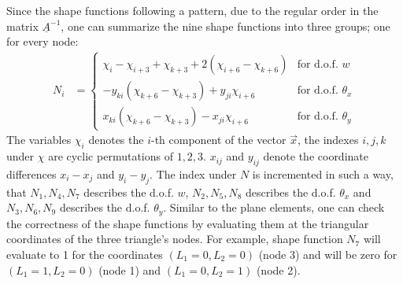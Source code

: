   Since the shape functions following a pattern, due to the regular order in the matrix $\underline{A}^{-1}$, one can summarize the nine shape functions into three groups; one for every node:
  \begin{align}
  N_i &= \begin{cases}
  \chi_i - \chi_{i+3} + \chi_{k+3} + 2\left(\chi_{i+6} - \chi_{k+6}\right) & \text{for d.o.f. } w\\
  -y_{ki}\left(\chi_{k+6} - \chi_{k+3}\right) + y_{ji} \chi_{i+6} & \text{for d.o.f. } \theta_x\\
  x_{ki}\left(\chi_{k+6} - \chi_{k+3}\right) - x_{ji} \chi_{i+6} & \text{for d.o.f. } \theta_y
  \end{cases}
  \end{align}
  The variables $\chi_i$ denotes the $i$-th component of the vector $\vec{x}$, the indexes $i,j,k$ under $\chi$ are cyclic permutations of $1,2,3$. $x_{ij}$ and $y_{ij}$ denote the coordinate differences $x_i - x_j$ and $y_i - y_j$. The index under $N$ is incremented in such a way, that $N_1, N_4, N_7$ describes the d.o.f. $w$, $N_2, N_5, N_8$ describes the d.o.f. $\theta_x$ and $N_3, N_6, N_9$ describes the d.o.f. $\theta_y$.
  Similar to the plane elements, one can check the correctness of the shape functions by evaluating them at the triangular coordinates of the three triangle's nodes. For example, shape function $N_7$ will evaluate to 1 for the coordinates $(L_1 = 0, L_2 = 0)$ (node 3) and will be zero for $(L_1 = 1, L_2 = 0)$ (node 1) and $(L_1 = 0, L_2 = 1)$ (node 2).
  
